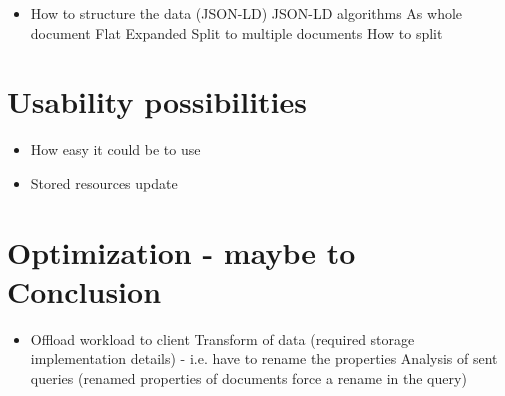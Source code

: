\begin{itemize}
	\item How to structure the data (JSON-LD)
		\subitem JSON-LD algorithms
		\subitem As whole document
			\subsubitem Flat
			\subsubitem Expanded
		\subitem Split to multiple documents
			\subsubitem How to split
\end{itemize}


\section{Usability possibilities}
\begin{itemize}
	\item How easy it could be to use
	\item Stored resources update
\end{itemize}

\section{Optimization - maybe to Conclusion}
\begin{itemize}
	\item Offload workload to client
		\subitem Transform of data (required storage implementation details) - i.e. have to rename the properties
		\subitem Analysis of sent queries (renamed properties of documents force a rename in the query)
\end{itemize}





